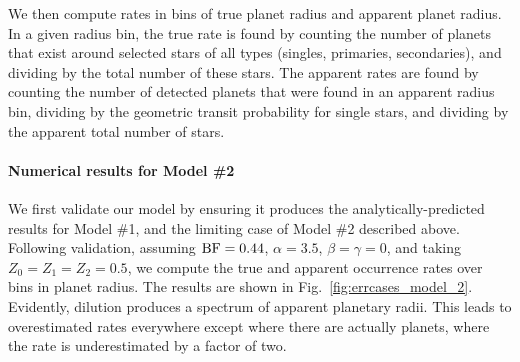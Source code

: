 We then compute rates in bins of true planet radius and apparent planet radius.
In a given radius bin, the true rate is found by counting the number of planets
that exist around selected stars of all types (singles, primaries,
secondaries), and dividing by the total number of these stars.
The apparent rates are found by counting the number of detected planets that
were found in an apparent radius bin, dividing by the geometric transit
probability for single stars, and dividing by the apparent total number of
stars.


\paragraph{Numerical results for Model \#2}
We first validate our model by ensuring it produces the analytically-predicted 
results for Model \#1, and the limiting case of Model \#2 described above.
Following validation, assuming ${\rm BF}=0.44$, $\alpha=3.5$, 
$\beta=\gamma=0$, and taking $Z_0=Z_1=Z_2=0.5$, we compute the true and 
apparent occurrence rates over bins in planet radius.
The results are shown in Fig.~\ref{fig:errcases_model_2}.
Evidently, dilution produces a spectrum of apparent planetary radii. This 
leads to overestimated rates everywhere except where there 
are actually planets, where the rate is underestimated by a factor of two.
